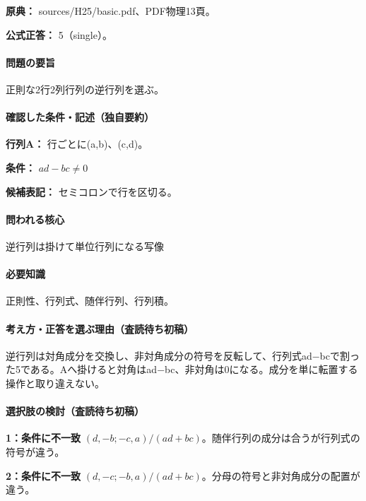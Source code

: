 \noindent\textbf{原典：} sources/H25/basic.pdf、PDF物理13頁。

\textbf{公式正答：} 5（single）。

\paragraph{問題の要旨} 正則な2行2列行列の逆行列を選ぶ。

\paragraph{確認した条件・記述（独自要約）}\mbox{}\par

\noindent\textbf{行列A：} 行ごとに(a,b)、(c,d)。\par

\noindent\textbf{条件：} \(ad-bc\neq0\)\par

\noindent\textbf{候補表記：} セミコロンで行を区切る。\par

\paragraph{問われる核心} 逆行列は掛けて単位行列になる写像

\paragraph{必要知識} 正則性、行列式、随伴行列、行列積。

\paragraph{考え方・正答を選ぶ理由（査読待ち初稿）} 逆行列は対角成分を交換し、非対角成分の符号を反転して、行列式ad−bcで割った5である。Aへ掛けると対角はad−bc、非対角は0になる。成分を単に転置する操作と取り違えない。

\paragraph{選択肢の検討（査読待ち初稿）}\mbox{}\par

\noindent\textbf{1：条件に不一致} \((d,-b;-c,a)/(ad+bc)\)。随伴行列の成分は合うが行列式の符号が違う。\par

\noindent\textbf{2：条件に不一致} \((d,-c;-b,a)/(ad+bc)\)。分母の符号と非対角成分の配置が違う。\par


